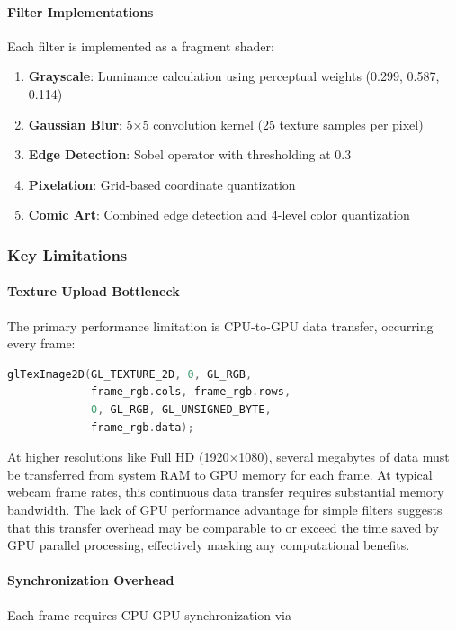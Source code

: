 \documentclass[12pt,a4paper]{article}
\begin{document}
\paragraph{Filter Implementations}
Each filter is implemented as a fragment shader:

\begin{enumerate}
    \item \textbf{Grayscale}: Luminance calculation using perceptual weights (0.299, 0.587, 0.114)
    \item \textbf{Gaussian Blur}: 5×5 convolution kernel (25 texture samples per pixel)
    \item \textbf{Edge Detection}: Sobel operator with thresholding at 0.3
    \item \textbf{Pixelation}: Grid-based coordinate quantization
    \item \textbf{Comic Art}: Combined edge detection and 4-level color quantization
\end{enumerate}

\subsubsection{Key Limitations}

\paragraph{Texture Upload Bottleneck}
The primary performance limitation is CPU-to-GPU data transfer, occurring every frame:

\begin{lstlisting}[language=C++]
glTexImage2D(GL_TEXTURE_2D, 0, GL_RGB, 
             frame_rgb.cols, frame_rgb.rows,
             0, GL_RGB, GL_UNSIGNED_BYTE, 
             frame_rgb.data);
\end{lstlisting}

At higher resolutions like Full HD (1920×1080), several megabytes of data must be transferred from system RAM to GPU memory for each frame. At typical webcam frame rates, this continuous data transfer requires substantial memory bandwidth. The lack of GPU performance advantage for simple filters suggests that this transfer overhead may be comparable to or exceed the time saved by GPU parallel processing, effectively masking any computational benefits.

\paragraph{Synchronization Overhead}
Each frame requires CPU-GPU synchronization via 
\end{document}
